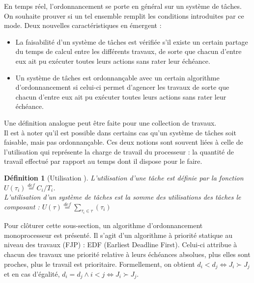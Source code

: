 \documentclass[12pt,a4paper,oneside]{book}
\theoremstyle{break}
\newtheorem{defin}{Définition}[chapter]
\theoremstyle{breakplain}
\begin{document}
En temps réel, l'ordonnancement se porte en général sur un système de tâches. On souhaite prouver si un tel ensemble remplit les conditions introduites par ce mode. Deux nouvelles caractéristiques en émergent \cite{goossens2014os} :

\begin{itemize}
\item La faisabilité d'un système de tâches est vérifiée s'il existe un certain partage du temps de calcul entre les différents travaux, de sorte que chacun d'entre eux ait pu exécuter toutes leurs actions sans rater leur échéance.
\item Un système de tâches est ordonnançable avec un certain algorithme d'ordonnancement si celui-ci permet d'agencer les travaux de sorte que chacun d'entre eux ait pu exécuter toutes leurs actions sans rater leur échéance.\\
\end{itemize}

Une définition analogue peut être faite pour une collection de travaux.\\

Il est à noter qu'il est possible dans certains cas qu'un système de tâches soit faisable, mais pas ordonnançable. Ces deux notions sont souvent liées à celle de l'utilisation qui représente la charge de travail du processeur : la quantité de travail effectué par rapport au temps dont il dispose pour le faire.\\

\begin{defin}[Utilisation \cite{goossens2014os}]
L'utilisation d'une tâche est définie par la fonction $U(\tau_i) \overset{def}{=} C_i/T_i$.\\
L'utilisation d'un système de tâches est la somme des utilisations des tâches le composant : $U(\tau) \overset{def}{=} \underset{\tau_i \in \tau}{\sum} (\tau_i)$
\end{defin}

Pour clôturer cette sous-section, un algorithme d'ordonnancement monoprocesseur est présenté. Il s'agit d'un algorithme à priorité statique au niveau des travaux (FJP) : EDF (Earliest Deadline First). Celui-ci attribue à chacun des travaux une priorité relative à leurs échéances absolues, plus elles sont proches, plus le travail est prioritaire. Formellement, on obtient $d_i < d_j \Leftrightarrow J_i \succ J_j$ et en cas d'égalité, $d_i = d_j \wedge i < j \Leftrightarrow J_i \succ J_j$.\\
\end{document}
